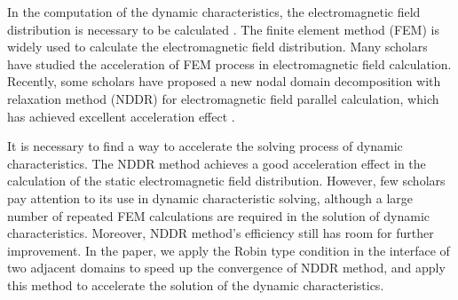 \documentclass[journal,transmag]{IEEEtran}
\begin{document}
In the computation of the dynamic characteristics, the electromagnetic field distribution is necessary to be calculated 
\cite{IEEEhowto:You}. The finite element method (FEM) is widely used to calculate the electromagnetic field distribution. Many scholars have studied the acceleration of FEM process in electromagnetic field calculation. Recently, some scholars have proposed a new nodal domain decomposition with relaxation method (NDDR) for electromagnetic field parallel calculation, which has achieved excellent acceleration effect  \cite{IEEEhowto:Liu}.

It is necessary to find a way to accelerate the solving process of dynamic characteristics. The NDDR method achieves a good acceleration effect in the calculation of the static electromagnetic field distribution. However, few scholars pay attention to its use in dynamic characteristic solving, although a large number of repeated FEM calculations are required in the solution of dynamic characteristics. Moreover, NDDR method's efficiency still has room for further improvement. In the paper, we apply the Robin type condition in the interface of two adjacent domains to speed up the convergence of NDDR method, and apply this method to accelerate the solution of the dynamic characteristics. 
\end{document}
